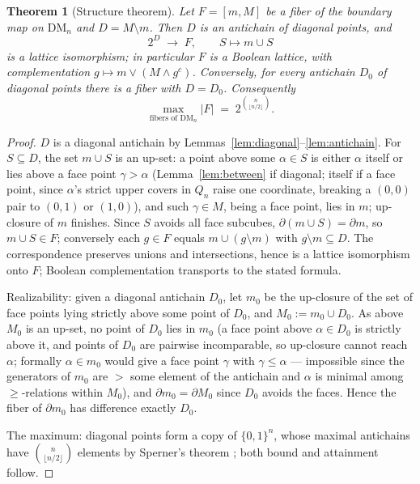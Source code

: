 \documentclass[11pt]{amsart}
\newtheorem{thm}{Theorem}[section]
\theoremstyle{definition}
\newcommand{\DM}{\mathrm{DM}}
\newcommand{\lc}{Q}                       %
\newcommand{\bnd}{\partial}
\begin{document}
\begin{thm}[Structure theorem]
  \label{thm:main}
  Let $F = [m, M]$ be a fiber of the boundary map on $\DM_n$ and
  $D = M \setminus m$.  Then $D$ is an antichain of diagonal points,
  and
  \[
    2^{D} \;\longrightarrow\; F, \qquad S \mapsto m \cup S
  \]
  is a lattice isomorphism; in particular $F$ is a Boolean lattice,
  with complementation $g \mapsto m \vee (M \wedge g^{c})$.
  Conversely, for every antichain $D_0$ of diagonal points there is a
  fiber with $D = D_0$.  Consequently
  \[
    \max_{\text{fibers of } \DM_n} |F|
    \;=\; 2^{\binom{n}{\lfloor n/2 \rfloor}} .
  \]
\end{thm}

\begin{proof}
  $D$ is a diagonal antichain by
  Lemmas~\ref{lem:diagonal}--\ref{lem:antichain}.  For $S \subseteq
  D$, the set $m \cup S$ is an up-set: a point above some
  $\alpha \in S$ is either $\alpha$ itself or lies above a face point
  $\gamma > \alpha$ (Lemma~\ref{lem:between} if diagonal; itself if a
  face point, since $\alpha$'s strict upper covers in $\lc_n$ raise
  one coordinate, breaking a $(0,0)$ pair to $(0,1)$ or $(1,0)$),
  and such $\gamma \in M$, being a face point, lies in $m$; up-closure
  of $m$ finishes.  Since $S$ avoids all face subcubes,
  $\bnd(m \cup S) = \bnd m$, so $m \cup S \in F$; conversely each
  $g \in F$ equals $m \cup (g \setminus m)$ with
  $g \setminus m \subseteq D$.  The correspondence preserves
  unions and intersections, hence is a lattice isomorphism onto
  $F$; Boolean complementation transports to the stated formula.

  Realizability: given a diagonal antichain $D_0$, let $m_0$ be the
  up-closure of the set of face points lying strictly above some
  point of $D_0$, and $M_0 := m_0 \cup D_0$.  As above $M_0$ is an
  up-set, no point of $D_0$ lies in $m_0$ (a face point above
  $\alpha \in D_0$ is strictly above it, and points of $D_0$ are
  pairwise incomparable, so up-closure cannot reach $\alpha$;
  formally $\alpha \in m_0$ would give a face point $\gamma$ with
  $\gamma \le \alpha$ --- impossible since the generators of $m_0$
  are $> $ some element of the antichain and $\alpha$ is minimal
  among $\ge$-relations within $M_0$), and
  $\bnd m_0 = \bnd M_0$ since $D_0$ avoids the faces.  Hence the
  fiber of $\bnd m_0$ has difference exactly $D_0$.

  The maximum: diagonal points form a copy of $\{0,1\}^n$, whose
  maximal antichains have $\binom{n}{\lfloor n/2 \rfloor}$ elements
  by Sperner's theorem \cite{Sperner}; both bound and attainment
  follow.
\end{proof}
\end{document}
